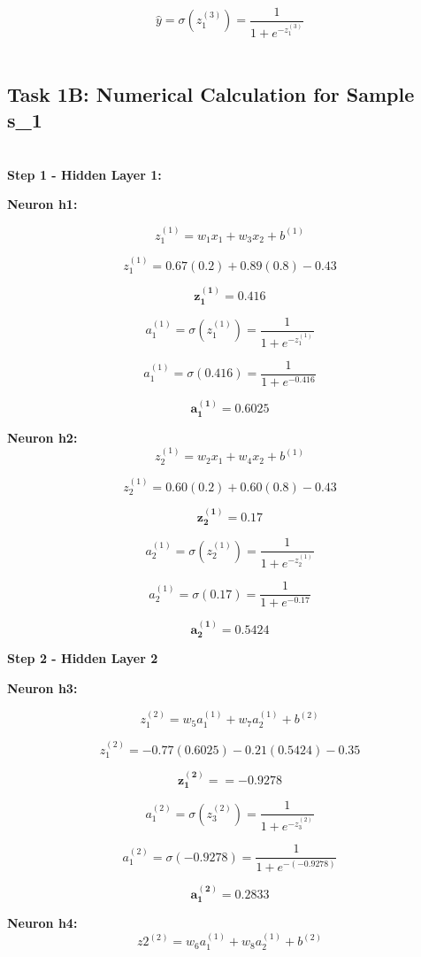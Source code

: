 \documentclass[runningheads]{llncs}
\begin{document}
\[
\hat{y} = \sigma(z_1^{(3)}) = \frac{1}{1 + e^{-z_1^{(3)}}}
\]
\\



\subsection{Task 1B: Numerical Calculation for Sample s_1}
\\
\textbf{Step 1 - Hidden Layer 1:\\}

\textbf{Neuron h1:}

\[
z_1^{(1)} = w_1 x_1 + w_3 x_2 + b^{(1)}
\]

\[
z_1^{(1)} = 0.67(0.2) + 0.89(0.8) - 0.43 
\]

\[
\mathbf{z_1^{(1)} = 0.416}
\]

\[
a_1^{(1)} = \sigma(z_1^{(1)}) = \frac{1}{1 + e^{-z_1^{(1)}}}
\]

\[
a_1^{(1)} = \sigma(0.416) = \frac{1}{1 + e^{-0.416}} 
\]

\[
\mathbf{a_1^{(1)} = 0.6025}
\]

\textbf{Neuron h2:}
\[
z_2^{(1)} = w_2 x_1 + w_4 x_2 + b^{(1)}
\]

\[
z_2^{(1)} = 0.60(0.2) + 0.60(0.8) - 0.43 
\]

\[
\mathbf{z_2^{(1)} = 0.17}
\]


\[
a_2^{(1)} = \sigma(z_2^{(1)}) = \frac{1}{1 + e^{-z_2^{(1)}}}
\]

\[
a_2^{(1)} = \sigma(0.17) = \frac{1}{1 + e^{-0.17}} 
\]

\[
\mathbf{a_2^{(1)} = 0.5424}
\]

\textbf{Step 2 - Hidden Layer 2\\}

\textbf{Neuron h3:}

\[
z_1^{(2)} = w_5 a_1^{(1)} + w_7 a_2^{(1)} + b^{(2)}
\]

\[
z_1^{(2)} = -0.77(0.6025) - 0.21(0.5424) - 0.35 
\]

\[
\mathbf{z_1^{(2)} = = -0.9278}
\]

\[
a_1^{(2)} = \sigma(z_3^{(2)}) = \frac{1}{1 + e^{-z_3^{(2)}}}
\]

\[
a_1^{(2)} = \sigma(-0.9278) = \frac{1}{1 + e^{-(-0.9278)}}
\]

\[
\mathbf{a_1^{(2)} = 0.2833}
\]

\textbf{Neuron h4:}
\[
z2^{(2)} = w_6 a_1^{(1)} + w_8 a_2^{(1)} + b^{(2)}
\]
\end{document}
